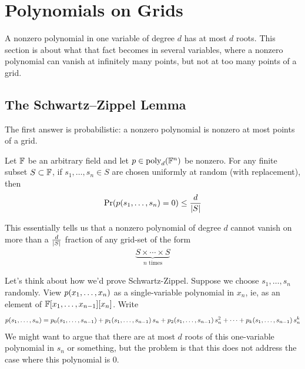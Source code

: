 \section{Polynomials on Grids}

A nonzero polynomial in one variable of degree $d$ has at most $d$ roots. This section is about what that fact becomes in several variables, where a nonzero polynomial can vanish at infinitely many points, but not at too many points of a grid.

\subsection{The Schwartz--Zippel Lemma}

The first answer is probabilistic: a nonzero polynomial is nonzero at most points of a grid.

\begin{boxlemma} \label{Ch8:Lemma:Schwartz_Zippel}
    Let $\mathbb{F}$ be an arbitrary field and let $p \in \operatorname{poly}_d\!\left( \mathbb{F}^n \right)$ be nonzero. For any finite subset $S \subset \mathbb{F}$, if $s_1, \ldots, s_n \in S$ are chosen uniformly at random (with replacement), then
    \begin{align*}
        \Pr\!\left( p\!\left( s_1, \ldots, s_n \right) = 0 \right) \leq \frac{d}{\left\lvert S \right\rvert}
    \end{align*}
\end{boxlemma}

This essentially tells us that a nonzero polynomial of degree $d$ cannot vanish on more than a $\frac{d}{\left\lvert S \right\rvert}$ fraction of any grid-set of the form
\begin{align*}
    \underbrace{S \times \cdots \times S}_{n \text{ times}}
\end{align*}

Let's think about how we'd prove Schwartz-Zippel. Suppose we choose $s_1, \ldots, s_n$ randomly. View $p\!\left( x_1, \ldots, x_n \right)$ as a single-variable polynomial in $x_n$, ie, as an element of $\mathbb{F}\!\left[ x_1, \ldots, x_{n - 1} \right]\!\left[ x_n \right]$. Write
\begin{align*}
    p\!\left( s_1, \ldots, s_n \right)
    = p_0\!\left( s_1, \ldots, s_{n-1} \right) + p_1\!\left( s_1, \ldots, s_{n-1} \right) s_n + p_2\!\left( s_1, \ldots, s_{n-1} \right) s_n^2 + \cdots + p_k\!\left( s_1, \ldots, s_{n-1} \right) s_n^k
\end{align*}
We might want to argue that there are at most $d$ roots of this one-variable polynomial in $s_n$ or something, but the problem is that this does not address the case where this polynomial is $0$.

